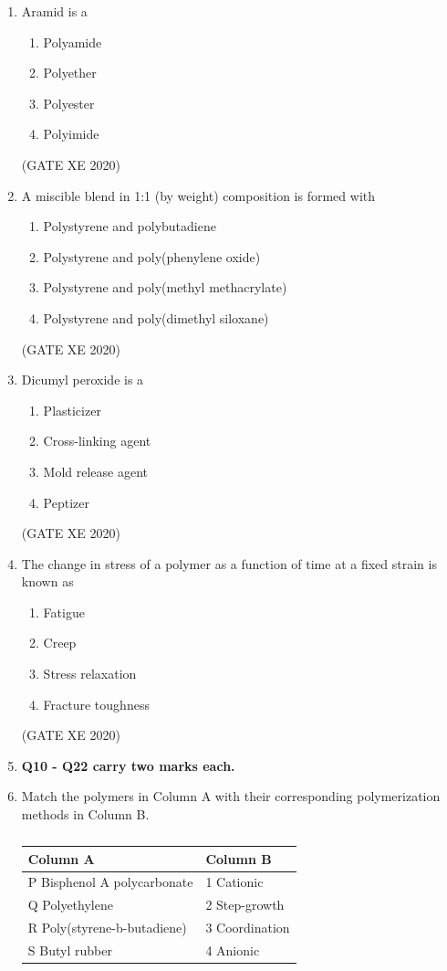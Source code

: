 \documentclass[12pt]{article}
\begin{document}
\begin{enumerate}
\item Aramid is a  
\begin{enumerate}
\item Polyamide  
\item Polyether  
\item Polyester  
\item Polyimide  
\end{enumerate}  
(GATE XE 2020)

\item A miscible blend in 1:1 (by weight) composition is formed with  
\begin{enumerate}
\item Polystyrene and polybutadiene  
\item Polystyrene and poly(phenylene oxide)  
\item Polystyrene and poly(methyl methacrylate)  
\item Polystyrene and poly(dimethyl siloxane)  
\end{enumerate}  
(GATE XE 2020)

\item Dicumyl peroxide is a  
\begin{enumerate}
\item Plasticizer  
\item Cross-linking agent  
\item Mold release agent  
\item Peptizer  
\end{enumerate}  
(GATE XE 2020)

\item The change in stress of a polymer as a function of time at a fixed strain is known as  
\begin{enumerate}
\item Fatigue  
\item Creep  
\item Stress relaxation  
\item Fracture toughness  
\end{enumerate}  
(GATE XE 2020)

\item[] \textbf{Q10 - Q22 carry two marks each.}
\item Match the polymers in Column A with their corresponding polymerization methods in Column B.

\begin{table}[H]
\centering
\caption{}
\label{}
\begin{tabular}{|l|l|}
\hline
\textbf{Column A} & \textbf{Column B} \\ \hline
P\; Bisphenol A polycarbonate & 1\; Cationic \\ \hline
Q\; Polyethylene               & 2\; Step-growth \\ \hline
R\; Poly(styrene-\!b-\!butadiene) & 3\; Coordination \\ \hline
S\; Butyl rubber              & 4\; Anionic \\ \hline
\end{tabular}
\end{table}


\end{enumerate}
\end{document}
